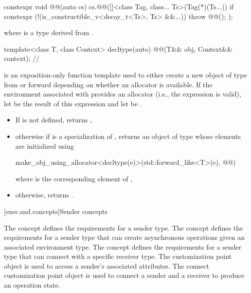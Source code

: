 \pnum
{}
\begin{codeblock}
constexpr void @@(auto cs) {
  cs.@@([]<class Tag, class... Ts>(Tag(*)(Ts...)) {
    if constexpr (!(is_constructible_v<decay_t<Ts>, Ts> &&...))
      throw @@();
  });
}
\end{codeblock}
where  is
a type derived from .

\begin{itemdecl}
template<class T, class Context>
  decltype(auto) @@(T&& obj, Context&& context);       // \expos
\end{itemdecl}

\begin{itemdescr}
\pnum
{} is an exposition-only function template
used to either
create a new object of type  from 
or forward  depending on whether an allocator is available.
If the environment associated with  provides an allocator
(i.e., the expression  is valid),
let  be the result of this expression
and let  be .

\pnum
\returns
\begin{itemize}
\item
If  is not defined, returns ,
\item
otherwise if  is a specialization of ,
returns an object of type  whose elements are initialized using
\begin{codeblock}
make_obj_using_allocator<decltype(e)>(std::forward_like<T>(e), @@)
\end{codeblock}
where  is the corresponding element of ,
\item
otherwise, returns .
\end{itemize}
\end{itemdescr}

[exec.snd.concepts]{Sender concepts}

\pnum
The  concept defines
the requirements for a sender type.
The  concept defines
the requirements for a sender type
that can create asynchronous operations given an associated environment type.
The  concept defines
the requirements for a sender type
that can connect with a specific receiver type.
The  customization point object is used to access
a sender's associated attributes.
The connect customization point object is used to connect
a sender and a receiver to produce an operation state.

